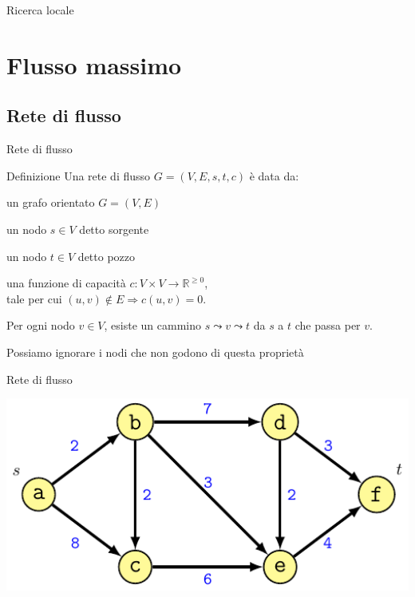 \begin{frame}{Ricerca locale}

\begin{center}
\end{center}

\end{frame}


\section{Flusso massimo}

\subsection{Rete di flusso}

\begin{frame}{Rete di flusso}

\vspace{-9pt}
\begin{block}{Definizione}
Una \alert{rete di flusso $G=(V,E,s,t,c)$} è data da:
\BI
\item un grafo orientato $G=(V,E)$
\item un nodo $s \in V$ detto \alert{sorgente}
\item un nodo $t \in V$ detto \alert{pozzo}
\item una funzione di \alert{capacità} $c: V \times V \rightarrow \mathbb{R}^{\geq 0}$,\\
tale per cui $(u,v) \not \in E \Rightarrow c(u,v)=0$.
\EI
\end{block}

\bigskip
{}
\BIL
\item Per ogni nodo $v \in V$, esiste un cammino $s \leadsto v \leadsto t$ 
da $s$ a $t$ che passa per $v$.
\item Possiamo ignorare i nodi che non godono di questa proprietà
\EIL

\end{frame}

\begin{frame}{Rete di flusso}

\includegraphics[width=1.0\textwidth]{template.pdf}

\end{frame}

